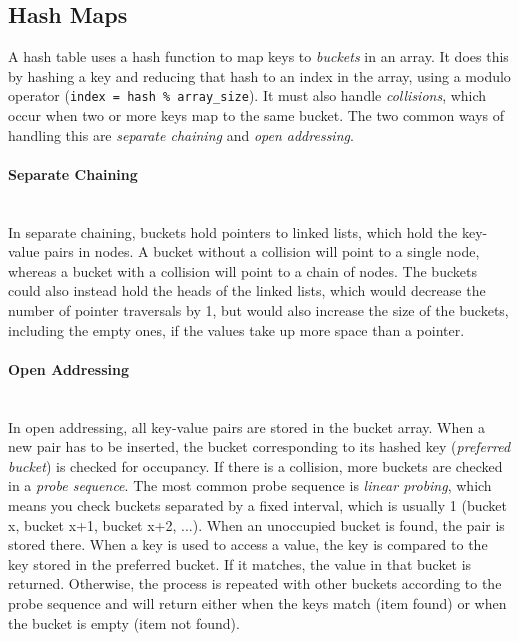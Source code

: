 \subsection{Hash Maps}

A hash table uses a hash function to map keys to \textit{buckets} in an array. It does this by hashing a key and reducing that hash to an index in the array, using a modulo operator (\texttt{index = hash \% array\_size}). It must also handle \textit{collisions}, which occur when two or more keys map to the same bucket. The two common ways of handling this are \textit{separate chaining} and \textit{open addressing}.

\paragraph{Separate Chaining} \hspace*{1mm} \\
In separate chaining, buckets hold pointers to linked lists, which hold the key-value pairs in nodes. A bucket without a collision will point to a single node, whereas a bucket with a collision will point to a chain of nodes. The buckets could also instead hold the heads of the linked lists, which would decrease the number of pointer traversals by 1, but would also increase the size of the buckets, including the empty ones, if the values take up more space than a pointer.

\paragraph{Open Addressing} \hspace*{1mm} \\
In open addressing, all key-value pairs are stored in the bucket array. When a new pair has to be inserted, the bucket corresponding to its hashed key (\textit{preferred bucket}) is checked for occupancy. If there is a collision, more buckets are checked in a \textit{probe sequence}. The most common probe sequence is \textit{linear probing}, which means you check buckets separated by a fixed interval, which is usually 1 (bucket x, bucket x+1, bucket x+2, ...). When an unoccupied bucket is found, the pair is stored there. When a key is used to access a value, the key is compared to the key stored in the preferred bucket. If it matches, the value in that bucket is returned. Otherwise, the process is repeated with other buckets according to the probe sequence and will return either when the keys match (item found) or when the bucket is empty (item not found).


